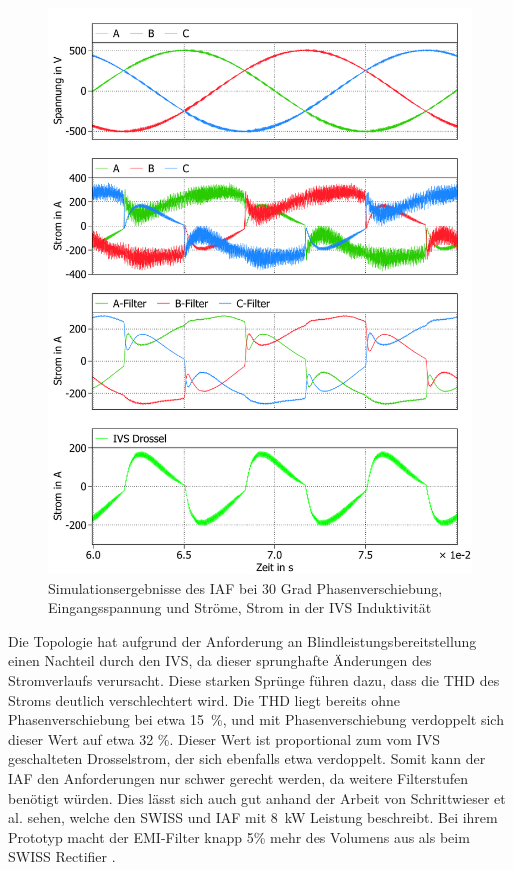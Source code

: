 		\begin{figure}
			\centering
			\includegraphics[width=1\linewidth]{content/Grafiken/IAF_AC+L_30Grad}
			\caption{Simulationsergebnisse des IAF bei 30 Grad Phasenverschiebung, Eingangsspannung und Ströme, Strom in der IVS Induktivität }
			\label{fig:iafacl30grad}
		\end{figure}
		Die Topologie hat aufgrund der Anforderung an Blindleistungsbereitstellung einen Nachteil durch den IVS, da dieser sprunghafte Änderungen des Stromverlaufs verursacht. Diese starken Sprünge führen dazu, dass die THD des Stroms deutlich verschlechtert wird. Die THD liegt bereits ohne Phasenverschiebung bei etwa 15~\%, und mit Phasenverschiebung verdoppelt sich dieser Wert auf etwa 32 \%. Dieser Wert ist proportional zum vom \gls{IVS} geschalteten Drosselstrom, der sich ebenfalls etwa verdoppelt.  Somit kann der IAF den Anforderungen nur schwer gerecht werden, da weitere Filterstufen benötigt würden. Dies lässt sich auch gut anhand der Arbeit von Schrittwieser et al. sehen, welche den SWISS und \gls{IAF} mit 8~kW Leistung beschreibt. Bei ihrem Prototyp macht der EMI-Filter knapp 5\% mehr des Volumens aus als beim SWISS Rectifier \cite{IAF99}.
		
